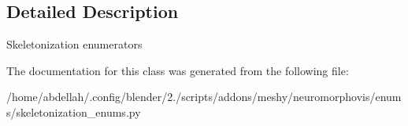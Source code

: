 \subsection{Detailed Description}


\begin{DoxyVerb}Skeletonization enumerators
\end{DoxyVerb}
 

The documentation for this class was generated from the following file\+:\begin{DoxyCompactItemize}
\item 
/home/abdellah/.\+config/blender/2./scripts/addons/meshy/neuromorphovis/enums/skeletonization\+\_\+enums.\+py\end{DoxyCompactItemize}
